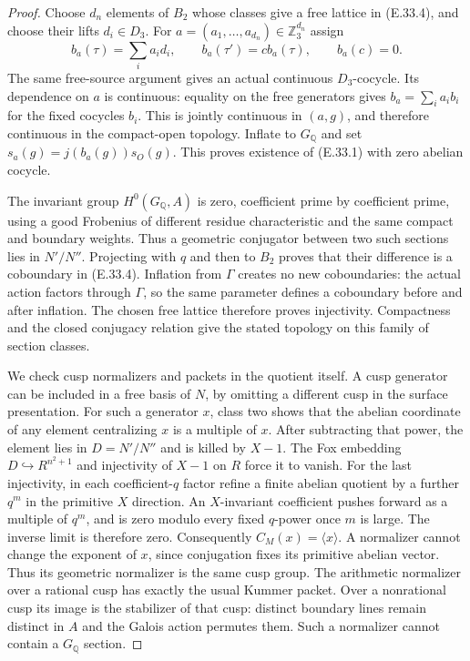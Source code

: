\begin{proof}
Choose $d_n$ elements of $B_2$ whose classes
give a free lattice in (E.33.4), and choose
their lifts $d_i\in D_3$. For
$a=(a_1,\ldots,a_{d_n})\in\mathbb Z_3^{d_n}$
assign
\[
 b_a(\tau)=\sum_i a_i d_i,\qquad
 b_a(\tau')=c b_a(\tau),\qquad b_a(c)=0.
 \tag{E.33.6}
\]
The same free-source argument gives an actual
continuous $D_3$-cocycle. Its dependence on $a$
is continuous: equality on the free generators
gives $b_a=\sum_i a_i b_i$ for the fixed cocycles
$b_i$. This is jointly continuous in $(a,g)$,
and therefore continuous in the compact-open
topology. Inflate to $G_{\mathbb Q}$
and set $s_a(g)=j(b_a(g))s_O(g)$. This proves
existence of (E.33.1) with zero abelian cocycle.

The invariant group $H^0(G_{\mathbb Q},A)$ is
zero, coefficient prime by coefficient prime,
using a good Frobenius of different residue
characteristic and the same compact and
boundary weights. Thus a geometric conjugator
between two such sections lies in $N'/N''$.
Projecting with $q$ and then to $B_2$ proves
that their difference is a coboundary in
(E.33.4). Inflation from $\Gamma$ creates no
new coboundaries: the actual action factors
through $\Gamma$, so the same parameter
defines a coboundary before and after
inflation. The chosen free lattice therefore
proves injectivity. Compactness and the
closed conjugacy relation give the stated
topology on this family of section classes.

We check cusp normalizers and packets in the
quotient itself. A cusp generator can be
included in a free basis of $N$, by omitting
a different cusp in the surface presentation.
For such a generator $x$, class two shows
that the abelian coordinate of any element
centralizing $x$ is a multiple of $x$.
After subtracting that power, the element
lies in $D=N'/N''$ and is killed by $X-1$.
The Fox embedding $D\hookrightarrow R^{n^2+1}$
and injectivity of $X-1$ on $R$ force it
to vanish. For the last injectivity, in each
coefficient-$q$ factor refine a finite
abelian quotient by a further $q^m$ in the
primitive $X$ direction. An $X$-invariant
coefficient pushes forward as a multiple
of $q^m$, and is zero modulo every fixed
$q$-power once $m$ is large. The inverse
limit is therefore zero. Consequently
$C_M(x)=\langle x\rangle$. A normalizer
cannot change the exponent of $x$, since
conjugation fixes its primitive abelian
vector. Thus its geometric normalizer is
the same cusp group. The arithmetic
normalizer over a rational cusp has
exactly the usual Kummer packet. Over a
nonrational cusp its image is the
stabilizer of that cusp: distinct boundary
lines remain distinct in $A$ and the
Galois action permutes them. Such a
normalizer cannot contain a $G_{\mathbb Q}$
section.


\end{proof}
